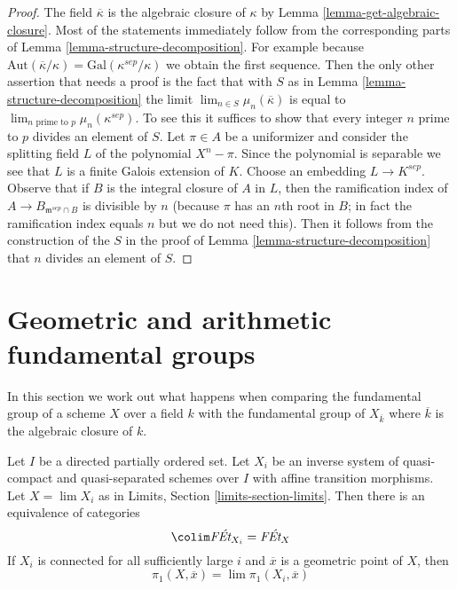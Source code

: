 \begin{proof}
The field $\overline{\kappa}$ is the algebraic closure of $\kappa$ by
Lemma \ref{lemma-get-algebraic-closure}.
Most of the statements immediately follow from the corresponding
parts of Lemma \ref{lemma-structure-decomposition}. For example because
$\text{Aut}(\overline{\kappa}/\kappa) = \text{Gal}(\kappa^{sep}/\kappa)$
we obtain the first sequence.
Then the only other assertion that needs a proof is the fact that
with $S$ as in Lemma \ref{lemma-structure-decomposition} the
limit $\lim_{n \in S} \mu_n(\overline{\kappa})$ is equal to
$\lim_{n\text{ prime to }p} \mu_n(\kappa^{sep})$. To see this
it suffices to show that every integer $n$ prime to $p$
divides an element of $S$.
Let $\pi \in A$ be a uniformizer and consider the splitting
field $L$ of the polynomial $X^n - \pi$. Since the polynomial
is separable we see that $L$ is a finite Galois extension of $K$.
Choose an embedding $L \to K^{sep}$.
Observe that if $B$ is the integral closure of $A$ in $L$,
then the ramification index of $A \to B_{\mathfrak m^{sep} \cap B}$
is divisible by $n$ (because $\pi$ has an $n$th root in $B$; in fact
the ramification index equals $n$ but we do not need this).
Then it follows from the construction of the $S$ in the proof of
Lemma \ref{lemma-structure-decomposition}
that $n$ divides an element of $S$.
\end{proof}








\section{Geometric and arithmetic fundamental groups}
\label{section-galois-action}

\noindent
In this section we work out what happens when comparing the
fundamental group of a scheme $X$ over a field $k$ with the
fundamental group of $X_{\overline{k}}$ where $\overline{k}$
is the algebraic closure of $k$.

\begin{lemma}
\label{lemma-limit}
Let $I$ be a directed partially ordered set. Let $X_i$ be an
inverse system of quasi-compact and quasi-separated schemes
over $I$ with affine transition morphisms.
Let $X = \lim X_i$ as in Limits, Section \ref{limits-section-limits}.
Then there is an equivalence of categories
$$
\colim \textit{F\'Et}_{X_i} = \textit{F\'Et}_X
$$
If $X_i$ is connected for all sufficiently large $i$ and $\overline{x}$
is a geometric point of $X$, then
$$
\pi_1(X, \overline{x}) = \lim \pi_1(X_i, \overline{x})
$$
\end{lemma}


